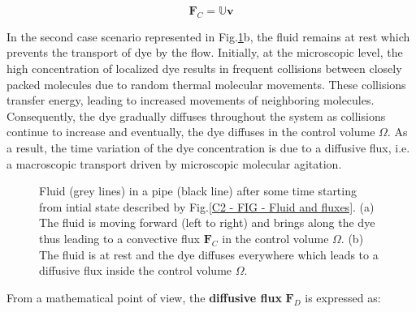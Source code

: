 \vspace{-1mm}
\begin{equation}
	\mathbf{F}_C = \mathbb{U} \mathbf{v}
	\label{C2 - EQ - Convective flux equation}
\end{equation}
\vspace{-0.5em}

In the second case scenario represented in Fig.\ref{C2 - FIG - Convective and Diffusive Flux}b, the fluid remains at rest which prevents the transport of dye by the flow. Initially, at the microscopic level, the high concentration of localized dye results in frequent collisions between closely packed molecules due to random thermal molecular movements. These collisions transfer energy, leading to increased movements of neighboring molecules. Consequently, the dye gradually diffuses throughout the system as collisions continue to increase and eventually, the dye diffuses in the control volume $\Omega$. As a result, the time variation of the dye concentration is due to a diffusive flux, i.e. a macroscopic transport driven by microscopic molecular agitation.

\newpage

\begin{figure}[!t]
    \begin{subfigure}[c]{0.5\textwidth}
        \resizebox{\linewidth}{0.6\linewidth}{}
        \caption{}
    \end{subfigure}
    \hfill
    \begin{subfigure}[c]{0.5\textwidth}
    	 \vspace{0.3mm}
        \resizebox{\linewidth}{0.6\linewidth}{}
        \caption{}
    \end{subfigure}
    \caption{Fluid (grey lines) in a pipe (black line) after some time starting from intial state described by Fig.\ref{C2 - FIG - Fluid and fluxes}. (a) The fluid is moving forward (left to right) and brings along the dye thus leading to a convective flux $\mathbf{F}_C$ in the control volume $\Omega$. (b) The fluid is at rest and the dye diffuses everywhere which leads to a diffusive flux inside the control volume $\Omega$.}
    \label{C2 - FIG - Convective and Diffusive Flux}
     \vspace{-1.2em}
\end{figure}


From a mathematical point of view, the \textbf{diffusive flux} $\mathbf{F}_D$ is expressed as:

